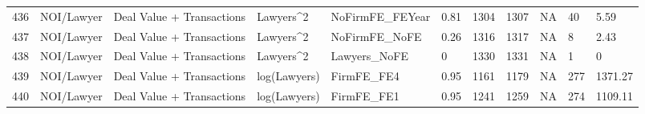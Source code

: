 \documentclass{article}
\begin{document}
\begin{table}[H]
\begin{tabular}{rllllllllll}
  436 & NOI/Lawyer & Deal Value + Transactions & Lawyers^2 & NoFirmFE\_FEYear & 0.81 & 1304 & 1307 & NA & 40 & 5.59 \\ 
  437 & NOI/Lawyer & Deal Value + Transactions & Lawyers^2 & NoFirmFE\_NoFE & 0.26 & 1316 & 1317 & NA & 8 & 2.43 \\ 
  438 & NOI/Lawyer & Deal Value + Transactions & Lawyers^2 & Lawyers\_NoFE & 0 & 1330 & 1331 & NA & 1 & 0 \\ 
  439 & NOI/Lawyer & Deal Value + Transactions & log(Lawyers) & FirmFE\_FE4 & 0.95 & 1161 & 1179 & NA & 277 & 1371.27 \\ 
  440 & NOI/Lawyer & Deal Value + Transactions & log(Lawyers) & FirmFE\_FE1 & 0.95 & 1241 & 1259 & NA & 274 & 1109.11 \\ 
   \hline
\end{tabular}
\end{table}
\end{document}
